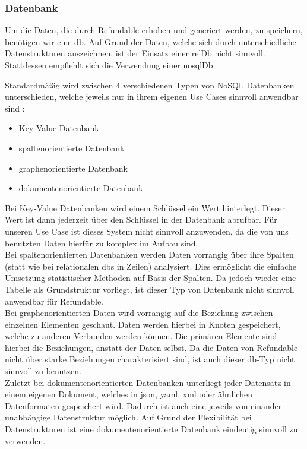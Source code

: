 		\subsubsection{Datenbank}
		Um die Daten, die durch Refundable erhoben und generiert werden, zu speichern, benötigen wir eine \gls{db}. Auf Grund der Daten, welche sich durch unterschiedliche Datenstrukturen auszeichnen, ist der Einsatz einer \gls{relDb} nicht sinnvoll. Stattdessen empfiehlt sich die Verwendung einer \gls{nosqlDb}.
		
		Standardmäßig wird zwischen 4 verschiedenen Typen von NoSQL Datenbanken unterschieden, welche jeweils nur in ihrem eigenen Use Cases sinnvoll anwendbar sind \cite{nosqltypes}:
		\begin{itemize}
			
			\item Key-Value Datenbank
			\item spaltenorientierte Datenbank
			\item graphenorientierte Datenbank
			\item dokumentenorientierte Datenbank
		\end{itemize}			
		Bei Key-Value Datenbanken wird einem Schlüssel ein Wert hinterlegt. Dieser Wert ist dann jederzeit über den Schlüssel in der Datenbank abrufbar. Für unseren Use Case ist dieses System nicht sinnvoll anzuwenden, da die von uns benutzten Daten hierfür zu komplex im Aufbau sind.~\\
		Bei spaltenorientierten Datenbanken werden Daten vorrangig über ihre Spalten (statt wie bei relationalen \gls{db}s in Zeilen) analysiert. Dies ermöglicht die einfache Umsetzung statistischer Methoden auf Basis der Spalten. Da jedoch wieder eine Tabelle als Grundstruktur vorliegt, ist dieser Typ von Datenbank nicht sinnvoll anwendbar für Refundable.~\\
		Bei graphenorientierten Daten wird vorrangig auf die Beziehung zwischen einzelnen Elementen geschaut. Daten werden hierbei in Knoten gespeichert, welche zu anderen Verbunden werden können. Die primären Elemente sind hierbei die Beziehungen, anstatt der Daten selbst. Da die Daten von Refundable nicht über starke Beziehungen charakterisiert sind, ist auch dieser \gls{db}-Typ nicht sinnvoll zu benutzen.~\\		
		Zuletzt bei dokumentenorientierten Datenbanken unterliegt jeder Datensatz in einem eigenen Dokument, welches in \Gls{json}, \Gls{yaml}, \Gls{xml} oder ähnlichen Datenformaten gespeichert wird. Dadurch ist auch eine jeweils von einander unabhängige Datenstruktur möglich. Auf Grund der Flexibilität bei Datenstrukturen ist eine dokumentenorientierte Datenbank eindeutig sinnvoll zu verwenden.~\\
		
